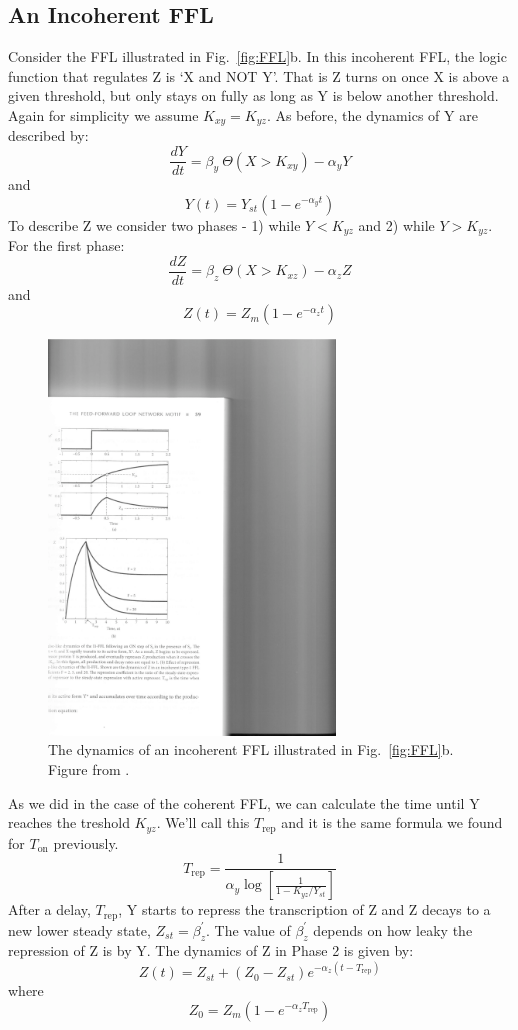 \documentclass[11pt,letterpaper,oneside,pagesize]{scrartcl}
\begin{document}
\subsection{An Incoherent FFL}

Consider the FFL illustrated in Fig.~\ref{fig:FFL}b.  In this incoherent FFL, the logic function that regulates Z is `X and NOT Y'. That is Z turns on once X is above a given threshold, but only stays on fully as long as Y is below another threshold. Again for simplicity we assume $K_{xy} = K_{yz}$. As before, the dynamics of Y are described by:
\[
\frac{dY}{dt} = \beta_y\ \Theta(X > K_{xy}) - \alpha_{y}Y
\]
and
\[
Y(t) = Y_{st}(1-e^{-\alpha_{y}t})
\]
%
To describe Z we consider two phases - 1) while $Y < K_{yz}$ and 2) while $Y > K_{yz}$. For the first phase:
%
\[
\frac{dZ}{dt} = \beta_z\ \Theta(X > K_{xz}) - \alpha_{z}Z
\]
and
\[
Z(t) = Z_{m}(1-e^{-\alpha_{z}t})
\]

\begin{figure}[lht]
\centering
 \includegraphics[width=3in]{incoh-ffl-trep.pdf}
\caption{The dynamics of an incoherent FFL illustrated in Fig.~\ref{fig:FFL}b. Figure from \cite{Alon2007}.}
\label{fig:incohffltrep}
\end{figure}


As we did in the case of the coherent FFL, we can calculate the time until Y reaches the treshold $K_{yz}$. We'll call this $T_{\mathrm{rep}}$ and it is the same formula we found for $T_{\mathrm{on}}$ previously.
%
\[
T_{\mathrm{rep}} = \frac{1}{\alpha_y \log[\frac{1}{1-K_{yz}/Y_{st}}]}
\]
%
After a delay, $T_{\mathrm{rep}}$, Y starts to repress the transcription of Z and Z decays to a new lower steady state, $Z_{st} = \beta_{z}^{'}$. The value of  $\beta_{z}^{'}$ depends on how leaky the repression of Z is by Y.  The dynamics of Z in Phase 2 is given by:
%
\[
Z(t) = Z_{st} + (Z_0 - Z_{st})e^{-\alpha_{z}(t-T_{\mathrm{rep}})}
\]
where
\[
Z_0 = Z_{m}(1-e^{-\alpha_{z}T_{\mathrm{rep}}})
\]
\end{document}
